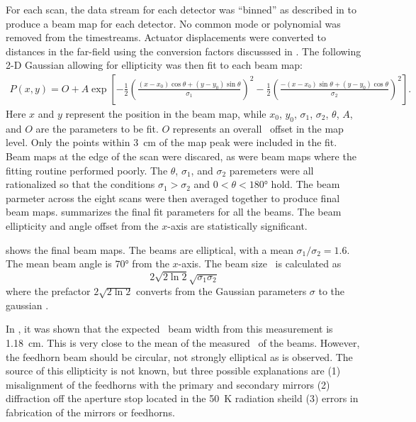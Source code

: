 For each scan, the data stream for each detector was ``binned'' as described in  to produce a beam map for each detector.
No common mode or polynomial was removed from the timestreams.
Actuator displacements were converted to distances in the far-field using the conversion factors discusssed in .
The following 2-D Gaussian allowing for ellipticity was then fit to each beam map:
\begin{multline}
  P(x,y) = O + A \exp{ \left[  - \frac{1}{2} \left( \frac{ (x-x_0) \cos{\theta} + (y-y_0) \sin{\theta}}{\sigma_1} \right)^2 
                               - \frac{1}{2} \left( \frac{-(x-x_0) \sin{\theta} + (y-y_0) \cos{\theta}}{\sigma_2} \right)^2
                       \right] }.
\end{multline}
Here $x$ and $y$ represent the position in the beam map, while $x_0$, $y_0$, $\sigma_1$, $\sigma_2$, $\theta$, $A$, and $O$ are the parameters to be fit.
$O$ represents an overall \DC\ offset in the map level.
Only the points within \SI{3}{\cm} of the map peak were included in the fit.
Beam maps at the edge of the scan were discared, as were beam maps where the fitting routine performed poorly.
The $\theta$, $\sigma_1$, and $\sigma_2$ paremeters were all rationalized so that the conditions $\sigma_1 > \sigma_2$ and $0 < \theta < \ang{180}$ hold.
The beam parmeter across the eight scans were then averaged together to produce final beam maps.
 summarizes the final fit parameters for all the beams.
The beam ellipticity and angle offset from the $x$-axis are statistically significant.

 shows the final beam maps.
The beams are elliptical, with a mean $\sigma_1 / \sigma_2 = \si{1.6}$.
The mean beam angle is $\ang{70}$ from the $x$-axis.
The beam size \FWHM\ is calculated as
\begin{equation}
  2 \sqrt{2 \ln{2}} \sqrt{\sigma_1 \sigma_2}
\end{equation}
where the prefactor $2 \sqrt{2 \ln{2}}$ converts from the Gaussian parameters $\sigma$ to the gaussian \FWHM.

In , it was shown that the expected \FWHM\ beam width from this measurement is \SI{1.18}{\cm}.
This is very close to the mean of the measured \FWHM\ of the beams.
However, the feedhorn beam should be circular, not strongly elliptical as is observed.
The source of this ellipticity is not known, but three possible explanations are (1) misalignment of the feedhorns with the primary and secondary mirrors (2) diffraction off the aperture stop located in the \SI{50}{\K} radiation sheild (3) errors in fabrication of the mirrors or feedhorns.

